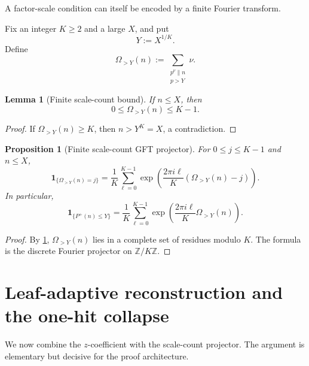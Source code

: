 \documentclass[11pt]{article}
\newtheorem{lemma}[theorem]{Lemma}
\newtheorem{proposition}[theorem]{Proposition}
\theoremstyle{definition}
\theoremstyle{remark}
\newcommand{\1}{\mathbf 1}
\begin{document}
A factor-scale condition can itself be encoded by a finite Fourier transform.

Fix an integer $K\ge2$ and a large $X$, and put
\begin{equation}\label{eq:Y}
Y:=X^{1/K}.
\end{equation}
Define
\begin{equation}\label{eq:Omega-large}
\Omega_{>Y}(n)
:=
\sum_{\substack{p^\nu\parallel n\\ p>Y}}\nu.
\end{equation}

\begin{lemma}[Finite scale-count bound]\label{lem:large-count-bound}
If $n\le X$, then
\begin{equation}\label{eq:large-count-range}
0\le\Omega_{>Y}(n)\le K-1.
\end{equation}
\end{lemma}

\begin{proof}
If $\Omega_{>Y}(n)\ge K$, then $n>Y^K=X$, a contradiction.
\end{proof}

\begin{proposition}[Finite scale-count GFT projector]\label{prop:scale-projector}
For $0\le j\le K-1$ and $n\le X$,
\begin{equation}\label{eq:scale-projector}
\1_{\{\Omega_{>Y}(n)=j\}}
=
\frac1K\sum_{\ell=0}^{K-1}
\exp\!\left(\frac{2\pi i\ell}{K}(\Omega_{>Y}(n)-j)\right).
\end{equation}
In particular,
\begin{equation}\label{eq:friable-projector}
\1_{\{P^+(n)\le Y\}}
=
\frac1K\sum_{\ell=0}^{K-1}
\exp\!\left(\frac{2\pi i\ell}{K}\Omega_{>Y}(n)\right).
\end{equation}
\end{proposition}

\begin{proof}
By \cref{lem:large-count-bound}, $\Omega_{>Y}(n)$ lies in a complete set of residues modulo $K$.  The formula is the discrete Fourier projector on $\mathbb Z/K\mathbb Z$.
\end{proof}

\section{Leaf-adaptive reconstruction and the one-hit collapse}\label{sec:onehit}

We now combine the $z$-coefficient with the scale-count projector.  The argument is elementary but decisive for the proof architecture.
\end{document}
